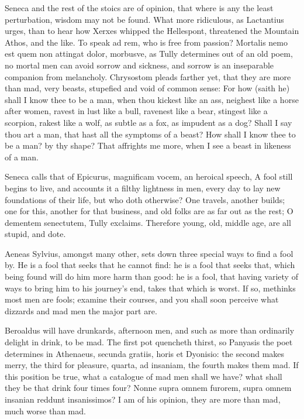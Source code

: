 {Seneca and the rest of the stoics are of opinion, that where is any the
least perturbation, wisdom may not be found. What more ridiculous, as
Lactantius urges, than to hear how Xerxes whipped the Hellespont,
threatened the Mountain Athos, and the like. To speak ad rem, who is
free from passion? Mortalis nemo est quem non attingat dolor,
morbusve, as Tully determines out of an old poem, no mortal men
can avoid sorrow and sickness, and sorrow is an inseparable companion
from melancholy. Chrysostom pleads farther yet, that they are more
than mad, very beasts, stupefied and void of common sense: For how
(saith he) shall I know thee to be a man, when thou kickest like an
ass, neighest like a horse after women, ravest in lust like a bull,
ravenest like a bear, stingest like a scorpion, rakest like a wolf, as
subtle as a fox, as impudent as a dog? Shall I say thou art a man, that
hast all the symptoms of a beast? How shall I know thee to be a man? by
thy shape? That affrights me more, when I see a beast in likeness of a
man.

Seneca calls that of Epicurus, magnificam vocem, an heroical
speech, A fool still begins to live, and accounts it a filthy lightness
in men, every day to lay new foundations of their life, but who doth
otherwise? One travels, another builds; one for this, another for that
business, and old folks are as far out as the rest; O dementem
senectutem, Tully exclaims. Therefore young, old, middle age, are all
stupid, and dote.

Aeneas Sylvius, amongst many other, sets down three special ways
to find a fool by. He is a fool that seeks that he cannot find: he is a
fool that seeks that, which being found will do him more harm than
good: he is a fool, that having variety of ways to bring him to his
journey's end, takes that which is worst. If so, methinks most men are
fools; examine their courses, and you shall soon perceive what dizzards
and mad men the major part are.

Beroaldus will have drunkards, afternoon men, and such as more than
ordinarily delight in drink, to be mad. The first pot quencheth thirst,
so Panyasis the poet determines in Athenaeus, secunda gratiis, horis et
Dyonisio: the second makes merry, the third for pleasure, quarta, ad
insaniam, the fourth makes them mad. If this position be true, what a
catalogue of mad men shall we have? what shall they be that drink four
times four? Nonne supra omnem furorem, supra omnem insanian reddunt
insanissimos? I am of his opinion, they are more than mad, much worse
than mad.

}
